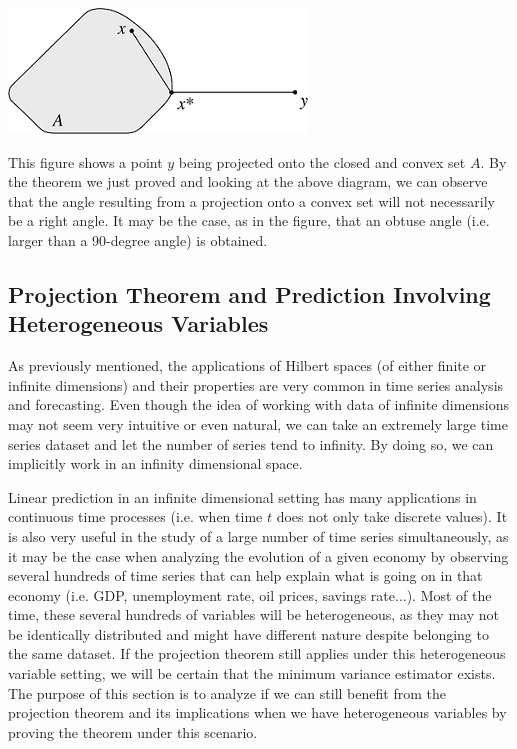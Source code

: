 \documentclass{article}
\begin{document}
\begin{center}
\includegraphics{fig2.png}
\end{center}

This figure shows a point $y$ being projected onto the closed and convex set $A$. By the theorem we just proved and looking at the above diagram, we can observe that the angle resulting from a projection onto a convex set will not necessarily be a right angle. It may be the case, as in the figure, that an obtuse angle (i.e. larger than a 90-degree angle) is obtained. \newline

\subsection{Projection Theorem and Prediction Involving Heterogeneous Variables}

As previously mentioned, the applications of Hilbert spaces (of either finite or infinite dimensions) and their properties are very common in time series analysis and forecasting. Even though the idea of working with data of infinite dimensions may not seem very intuitive or even natural, we can take an extremely large time series dataset and let the number of series tend to infinity. By doing so, we can implicitly work in an infinity dimensional space. \newline

Linear prediction in an infinite dimensional setting has many applications in continuous time processes (i.e. when time $t$ does not only take discrete values). It is also very useful in the study of a large number of time series simultaneously, as it may be the case when analyzing the evolution of a given economy by observing several hundreds of time series that can help explain what is going on in that economy (i.e. GDP, unemployment rate, oil prices, savings rate...). Most of the time, these several hundreds of variables will be heterogeneous, as they may not be identically distributed and might have different nature despite belonging to the same dataset. If the projection theorem still applies under this heterogeneous variable setting, we will be certain that the minimum variance estimator exists. The purpose of this section is to analyze if we can still benefit from the projection theorem and its implications when we have heterogeneous variables by proving the theorem under this scenario. \newline
\end{document}
